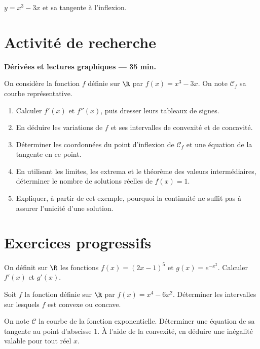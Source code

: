 \begin{center}\par\small $y=x^3-3x$ et sa tangente à l'inflexion.\end{center}

\mxnewpage
\section{Activité de recherche}\textbf{Dérivées et lectures graphiques --- 35 min.}\par On considère la fonction $f$ définie sur $\R$ par $f(x)=x^3-3x$. On note $\mathcal C_f$ sa courbe représentative.
\begin{enumerate}\item Calculer $f' (x)$ et $f'' (x)$, puis dresser leurs tableaux de signes.
\item En déduire les variations de $f$ et ses intervalles de convexité et de concavité.
\item Déterminer les coordonnées du point d'inflexion de $\mathcal C_f$ et une équation de la tangente en ce point.
\item En utilisant les limites, les extrema et le théorème des valeurs intermédiaires, déterminer le nombre de solutions réelles de $f(x)=1$.
\item Expliquer, à partir de cet exemple, pourquoi la continuité ne suffit pas à assurer l'unicité d'une solution.\end{enumerate}

\mxnewpage
\section{Exercices progressifs}

On définit sur $\R$ les fonctions $f(x)=(2x-1)^5$ et $g(x)=e^{-x^2}$. Calculer $f' (x)$ et $g' (x)$.

Soit $f$ la fonction définie sur $\R$ par $f(x)=x^4-6x^2$. Déterminer les intervalles sur lesquels $f$ est convexe ou concave.

On note $\mathcal C$ la courbe de la fonction exponentielle. Déterminer une équation de sa tangente au point d'abscisse $1$. À l'aide de la convexité, en déduire une inégalité valable pour tout réel $x$.

